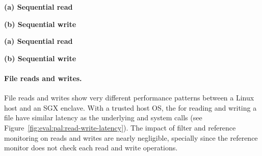  


\begin{figure*}[t!]
\centering
\footnotesize
{}
\parbox{0.49\textwidth}{\centering\bf (a) Sequential read}
\parbox{0.49\textwidth}{\centering\bf (b) Sequential write}
\caption{Latency of sequential  and  on the Linux PAL,
versus  and  on Linux.
Lower is better.
Figure (a) and (b) respectively compares  and  on the Linux PAL,
with and without a \seccomp{} filter ({\bf +SC})
and reference monitor ({\bf +RM}), against  and  on Linux.}
\label{fig:eval:pal:read-write-latency}
\end{figure*}

\begin{figure*}[t!]
\centering
\footnotesize
{}
\parbox{0.49\textwidth}{\centering\bf (a) Sequential read}
\parbox{0.49\textwidth}{\centering\bf (b) Sequential write}
\caption{Latency of sequential  and  on the \sgx{} PAL,
versus the Linux PAL and Linux.
Lower is better.
Figure (a) and (b) respectively compares  and  on the \sgx{} PAL,
with and without integrity checks ({\bf +CHK})
and reference monitor ({\bf +RM}), against the Linux PAL and  and  on Linux. The current design does not support integrity checks for .}
\label{fig:eval:pal:sgx-read-write-latency}
\end{figure*}


\paragraph{File reads and writes.}
File reads and writes show very different performance patterns between a Linux host and an SGX enclave.
With a trusted host OS,
the \hostapis{} for reading and writing a file
have similar latency as the underlying  and  system calls (see Figure~\ref{fig:eval:pal:read-write-latency}).
The impact of \seccomp{} filter and reference monitoring
on reads and writes
are nearly negligible, specially since
the reference monitor does not check each read and write operations.

